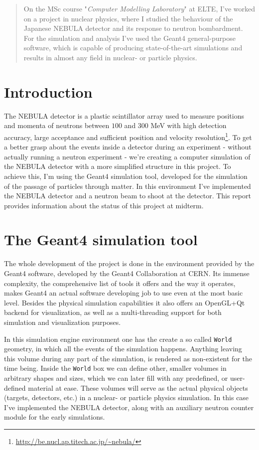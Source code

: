 \begin{abstract}
	On the MSc course "\textit{Computer Modelling Laboratory}" at ELTE, I've worked on a project in nuclear physics, where I studied the behaviour of the Japanese NEBULA detector and its response to neutron bombardment. For the simulation and analysis I've used the Geant4 general-purpose software, which is capable of producing state-of-the-art simulations and results in almost any field in nuclear- or particle physics.
\end{abstract}

\begin{multicols}{2}
\section{Introduction} \label{sec:1}
The NEBULA detector is a plastic scintillator array used to measure positions and momenta of neutrons between $100$ and $300$ MeV with high detection accuracy, large acceptance and sufficient position and velocity resolution\footnote{\url{http://be.nucl.ap.titech.ac.jp/~nebula/}}. To get a better grasp about the events inside a detector during an experiment - without actually running a neutron experiment - we're creating a computer simulation of the NEBULA detector with a more simplified structure in this project. To achieve this, I'm using the Geant4 simulation tool, developed for the simulation of the passage of particles through matter. In this environment I've implemented the NEBULA detector and a neutron beam to shoot at the detector. This report provides information about the status of this project at midterm.

\section{The Geant4 simulation tool} \label{sec:2}
The whole development of the project is done in the environment provided by the Geant4 software, developed by the Geant4 Collaboration at CERN. Its immense complexity, the comprehensive list of tools it offers and the way it operates, makes Geant4 an actual software developing job to use even at the most basic level. Besides the physical simulation capabilities it also offers an OpenGL+Qt backend for visualization, as well as a multi-threading support for both simulation and visualization purposes.

In this simulation engine environment one has the create a so called \texttt{World} geometry, in which all the events of the simulation happens. Anything leaving this volume during any part of the simulation, is rendered as non-existent for the time being. Inside the \texttt{World} box we can define other, smaller volumes in arbitrary shapes and sizes, which we can later fill with any predefined, or user-defined material at ease. These volumes will serve as the actual physical objects (targets, detectors, etc.) in a nuclear- or particle physics simulation. In this case I've implemented the NEBULA detector, along with an auxiliary neutron counter module for the early simulations.


\end{multicols}
